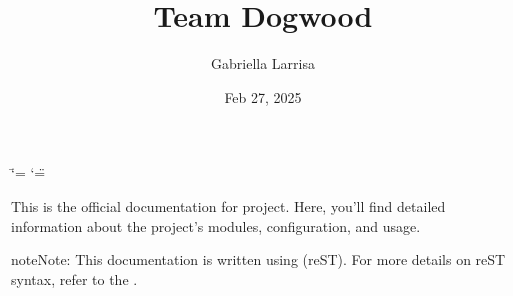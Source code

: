 \documentclass[letterpaper,10pt,english]{sphinxmanual}
\title{Team Dogwood}
\date{Feb 27, 2025}
\author{Gabriella Larrisa}
\begin{document}
\ifdefined\shorthandoff
  \ifnum\catcode`\=\string=\active\shorthandoff{=}\fi
  \ifnum\catcode`\"=\active{}\fi
\fi

\pagestyle{empty}
\sphinxmaketitle
\pagestyle{plain}
\sphinxtableofcontents
\pagestyle{normal}
\label{\detokenize{index::doc}}


\sphinxAtStartPar
This is the official documentation for  project. Here, you’ll find detailed information about the project’s modules, configuration, and usage.

\begin{sphinxadmonition}{note}{Note:}
\sphinxAtStartPar
This documentation is written using  (reST). For more details on reST syntax, refer to the
.
\end{sphinxadmonition}
\end{document}
